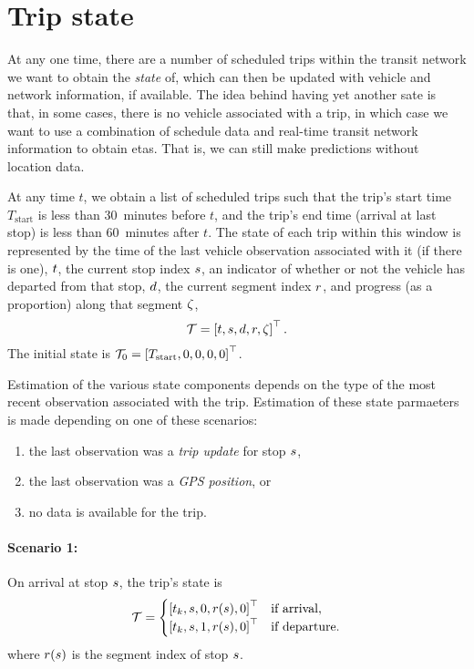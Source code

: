 \section{Trip state}
\label{sec:trip_state}


At any one time, there are a number of scheduled trips within the transit network we want to obtain the \emph{state} of, which can then be updated with \rt{} vehicle and network information, if available. The idea behind having yet another sate is that, in some cases, there is no vehicle associated with a trip, in which case we want to use a combination of schedule data and real-time transit network information to obtain \glspl{eta}. That is, we can still make \rt{} predictions without location data.

At any time $t$, we obtain a list of scheduled trips such that the trip's start time $T_\text{start}$ is less than 30~minutes before $t$, and the trip's end time (arrival at last stop) is less than 60~minutes after $t$. The state of each trip within this window is represented by the time of the last vehicle observation associated with it (if there is one), $t$, the current stop index $s$, an indicator of whether or not the vehicle has departed from that stop, $d$, the current segment index $r$, and progress (as a proportion) along that segment $\zeta$,
\begin{equation}
\label{eq:trip_state}
\mathcal{T} = \left[t, s, d, r, \zeta\right]^\top.
\end{equation}
The initial state is $\mathcal{T}_0 = \left[T_\text{start},0,0,0,0\right]^\top$.

Estimation of the various state components depends on the type of the most recent observation associated with the trip. Estimation of these state parmaeters is made depending on one of these scenarios:
\begin{enumerate}
\item the last observation was a \emph{trip update} for stop $s$,
\item the last observation was a \emph{GPS position}, or
\item no data is available for the trip.
\end{enumerate}


\paragraph{Scenario 1:}
On arrival at stop $s$, the trip's state is
\begin{equation}
\label{eq:trip_state_tu}
\mathcal{T} =
\begin{cases}
\left[t_k, s, 0, r(s), 0\right]^\top & \text{if arrival}, \\
\left[t_k, s, 1, r(s), 0\right]^\top & \text{if departure}.
\end{cases}
\end{equation}
where $r(s)$ is the segment index of stop $s$.


